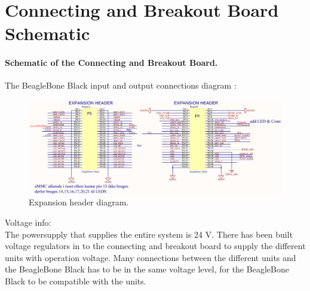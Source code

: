 \chapter{Connecting and Breakout Board Schematic}\label{app:ConnectingBreakoutBoard} 

\subsubsection{Schematic of the Connecting and Breakout Board.}

The BeagleBone Black input and output connections diagram :\\
\begin{figure}[H]
	\centering
	\includegraphics[scale=0.92]{figures/ExpanionHeader.pdf}
	\caption{Expansion header diagram.}
	\label{labExpanionHeader}
\end{figure}\vspace{-5mm}


Voltage info:\\
The powersupply that supplies the entire system is 24 V. There has been built voltage regulators in to the connecting and breakout board to supply the different units with operation voltage. Many connections between the different units and the BeagleBone Black has to be in the same voltage level, for the BeagleBone Black to be compatible with the units.

